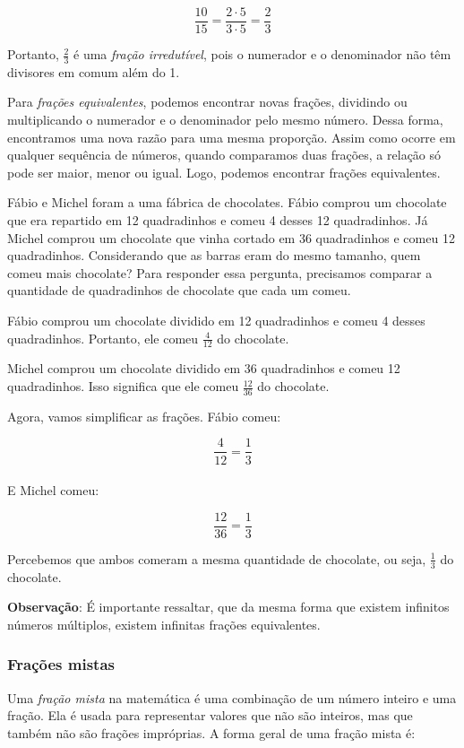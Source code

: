 {$$\frac{10}{15} = \frac{2 \cdot 5}{3 \cdot 5} = \frac{2}{3}$$

Portanto, $\frac{2}{3}$ é uma \textit{fração irredutível}, pois o numerador e o
denominador não têm divisores em comum além do 1.

Para \textit{frações equivalentes},
podemos encontrar novas frações, dividindo ou multiplicando o numerador
e o denominador pelo mesmo número. Dessa forma, encontramos uma nova
razão para uma mesma proporção. Assim como ocorre em qualquer sequência
de números, quando comparamos duas frações, a relação só pode ser maior,
menor ou igual. Logo, podemos encontrar frações equivalentes.

\medskip{}

Fábio e Michel foram a uma fábrica de chocolates. Fábio comprou um
chocolate que era repartido em 12 quadradinhos e comeu 4 desses 12
quadradinhos. Já Michel comprou um chocolate que vinha cortado em 36
quadradinhos e comeu 12 quadradinhos. Considerando que as barras eram
do mesmo tamanho, quem comeu mais chocolate?
Para responder essa pergunta, precisamos comparar a quantidade de quadradinhos
de chocolate que cada um comeu.

Fábio comprou um chocolate dividido em 12 quadradinhos e comeu 4 desses
quadradinhos. Portanto, ele comeu $\frac{4}{12}$ do chocolate.

Michel comprou um chocolate dividido em 36 quadradinhos e comeu 12
quadradinhos. Isso significa que ele comeu $\frac{12}{36}$ do chocolate.

Agora, vamos simplificar as frações. Fábio comeu:

$$\frac{4}{12} = \frac{1}{3}$$
\ \\

E Michel comeu:

$$\frac{12}{36} = \frac{1}{3}$$

Percebemos que ambos comeram a mesma quantidade de chocolate, ou seja, $\frac
{1}{3}$ do chocolate. 

\medskip\noindent \textbf{Observação}: É importante ressaltar, que da mesma forma que
existem infinitos números múltiplos, existem infinitas frações
equivalentes.

\subsubsection*{Frações mistas}

Uma \textit{fração mista} na matemática é uma combinação de um número inteiro e uma
fração. Ela é usada para representar valores que não são inteiros, mas que
também não são frações impróprias. A forma geral de uma fração mista é:

}
